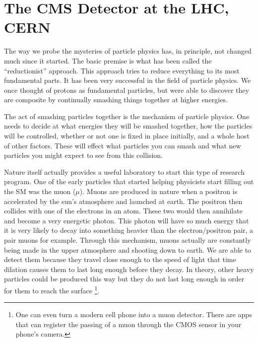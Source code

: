 \chapter{The CMS Detector at the LHC, CERN}
\label{chap:three}

The way we probe the mysteries of particle physics has, in principle, not changed much since it started.
The basic premise is what has been called the ``reductionist'' approach. 
This approach tries to reduce everything to its most fundamental parts.
It has been very successful in the field of particle physics. We once thought of protons as fundamental particles, but were able to discover they are composite by continually smashing things together at higher energies.

The act of smashing particles together is the mechanism of particle physics. 
One needs to decide at what energies they will be smashed together, how the particles will be controlled, whether or not one is fixed in place initially, and a whole host of other factors.
These will effect what particles you can smash and what new particles you might expect to see from this collision.

Nature itself actually provides a useful laboratory to start this type of research program.
One of the early particles that started helping physicists start filling out the SM was the muon ($\mu$).
Muons are produced in nature when a positron is accelerated by the sun's atmosphere and launched at earth.
The positron then collides with one of the electrons in an atom. These two would then annihilate and become a very energetic photon.
This photon will have so much energy that it is very likely to decay into something heavier than the electron/positron pair, a pair muons for example.
Through this mechanism, muons actually are constantly being made in the upper atmosphere and shooting down to earth. 
We are able to detect them because they travel close enough to the speed of light that time dilation causes them to last long enough before they decay.
In theory, other heavy particles could be produced this way but they do not last long enough in order for them to reach the surface \footnote{One can even turn a modern cell phone into a muon detector. There are apps that can register the passing of a muon through the CMOS sensor in your phone's camera.}.


